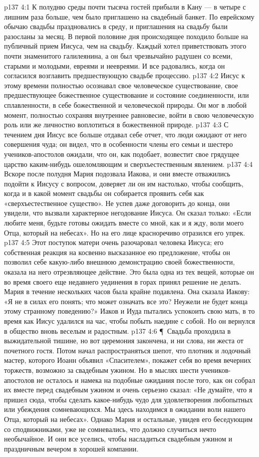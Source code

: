 \vs p137 4:1 К полудню среды почти тысяча гостей прибыли в Кану --- в четыре с лишним раза больше, чем было приглашено на свадебный банкет. По еврейскому обычаю свадьбы праздновались в среду, и приглашения на свадьбу были разосланы за месяц. В первой половине дня происходящее походило больше на публичный прием Иисуса, чем на свадьбу. Каждый хотел приветствовать этого почти знаменитого галилеянина, а он был чрезвычайно радушен со всеми, старыми и молодыми, евреями и неевреями. И все радовались, когда он согласился возглавить предшествующую свадьбе процессию.
\vs p137 4:2 Иисус к этому времени полностью осознавал свое человеческое существование, свое предшествующее божественное существование и состояние соединенности, или сплавленности, в себе божественной и человеческой природы. Он мог в любой момент, полностью сохраняя внутреннее равновесие, войти в свою человеческую роль или же личностно воплотиться в божественной природе.
\vs p137 4:3 С течением дня Иисус все больше отдавал себе отчет, что люди ожидают от него совершения чуда; он видел, что в особенности члены его семьи и шестеро учеников\hyp{}апостолов ожидали, что он, как подобает, возвестит свое грядущее царство каким\hyp{}нибудь ошеломляющим и сверхъестественным явлением.
\vs p137 4:4 Вскоре после полудня Мария подозвала Иакова, и они вместе отважились подойти к Иисусу с вопросом, доверяет ли он им настолько, чтобы сообщить, когда и в какой момент свадьбы он собирается проявить себя как «сверхъестественное существо». Не успев даже договорить до конца, они увидели, что вызвали характерное негодование Иисуса. Он сказал только: «Если любите меня, будьте готовы ожидать вместе со мной, как и я жду, воли моего Отца, который на небесах». Но на его лице красноречиво отразился его упрек.
\vs p137 4:5 Этот поступок матери очень разочаровал человека Иисуса; его собственная реакция на косвенно высказанное ею предложение, чтобы он позволил себе какую\hyp{}либо внешнюю демонстрацию своей божественности, оказала на него отрезвляющее действие. Это была одна из тех вещей, которые он во время своего еще недавнего уединения в горах принял решение не делать. Мария в течение нескольких часов была крайне подавлена. Она сказала Иакову: «Я не в силах его понять; что может означать все это? Неужели не будет конца этому странному поведению?» Иаков и Иуда пытались успокоить свою мать, в то время как Иисус удалился на час, чтобы побыть наедине с собой. Но он вернулся в общество вновь веселым и радостным.
\vs p137 4:6 \P\ Свадьба проходила в выжидательной тишине, но вот церемония закончена, и ни слова, ни жеста от почетного гостя. Потом начал распространяться шепот, что плотник и лодочный мастер, которого Иоанн объявил «Спасителем», покажет себя во время вечерних торжеств, возможно за свадебным ужином. Но в мыслях шести учеников\hyp{}апостолов не осталось и намека на подобные ожидания после того, как он собрал их вместе перед свадебным ужином и очень серьезно сказал: «Не думайте, что я пришел сюда, чтобы сделать какое\hyp{}нибудь чудо для удовлетворения любопытных или убеждения сомневающихся. Мы здесь находимся в ожидании воли нашего Отца, который на небесах». Однако Мария и остальные, увидев его беседующим со сподвижниками, уже не сомневались, что должно случиться нечто необычайное. И они все уселись, чтобы насладиться свадебным ужином и праздничным вечером в хорошей компании.
